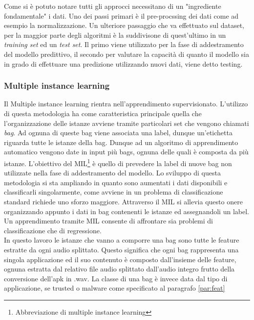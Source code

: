 Come si è potuto notare tutti gli approcci necessitano di un "ingrediente fondamentale" i dati. Uno dei passi primari è il pre-procssing dei dati come ad esempio la normalizzazione. 
Un ulteriore passaggio che va effettuato sul dataset, per la maggior parte degli algoritmi è la suddivisone di quest'ultimo in un \textit{training set} ed un \textit{test set}. Il primo viene utilizzato per la fase di addestramento del modello predittivo, il secondo per valutare la capacità di quanto il modello sia in grado di effettuare una predizione utilizzando nuovi dati, viene detto testing. 

\subsubsection{Multiple instance learning}
\label{subsub:mil}
Il Multiple instance learning rientra nell'apprendimento supervisionato. L'utilizzo di questa metodologia ha come caratteristica principale quella che l'organizzazione delle istanze avviene tramite particolari set che vengono chiamati \textit{bag}. Ad ognuna di queste bag viene associata una label, dunque un'etichetta riguarda tutte le istanze della bag\cite{enwiki:972908596}. Dunque ad un algoritmo di apprendimento automatico vengono date in input più bags, ognuna delle quali è composta da più istanze. 
L'obiettivo del MIL\footnote{Abbreviazione di multiple instance learning} è quello di prevedere la label di nuove bag non utilizzate nella fase di addestramento del modello. Lo sviluppo di questa metodologia si sta ampliando in quanto sono aumentati i dati disponibili e classificarli singolarmente, come avviene in un problema di classificazione standard richiede uno sforzo maggiore. Attraverso il MIL si allevia questo onere\cite{Carbonneau_2018} organizzando appunto i dati in bag contenenti le istanze ed assegnandoli un label. Un apprendimento tramite MIL consente di affrontare sia problemi di classificazione che di regressione. 
\\In questo lavoro le istanze che vanno a comporre una bag sono tutte le feature estratte da ogni audio splittato. Questo significa che ogni bag rappresenta una singola applicazione ed il suo contenuto è composto dall'insieme delle feature, ognuna estratta dal relativo file audio splittato dall'audio integro frutto della conversione dell'apk in .wav. La classe di una bag è invece data dal tipo di applicazione, se trusted o malware come specificato al paragrafo \ref{par:feat}

